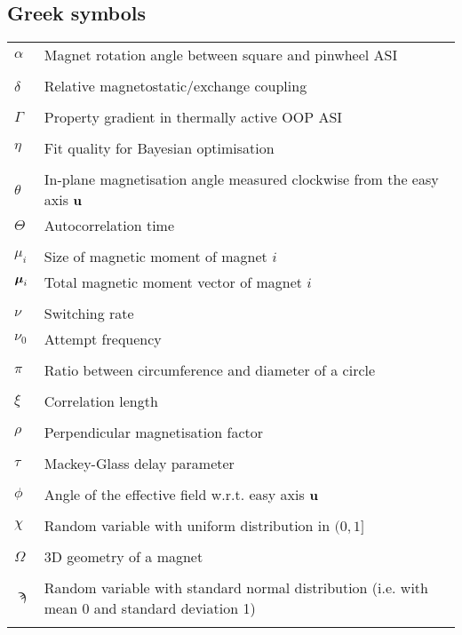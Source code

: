 \subsection*{Greek symbols}
\begin{longtable}[l]{p{60pt} p{350pt}}
	$\alpha$ & Magnet rotation angle between square and pinwheel ASI \\
	&\\

	$\delta$ & Relative magnetostatic/exchange coupling \\
	&\\

	$\Gamma$ & Property gradient in thermally active OOP ASI \\
	&\\
	
	$\eta$ & Fit quality for Bayesian optimisation \\
	&\\

	$\theta$ & In-plane magnetisation angle measured clockwise from the easy axis $\boldsymbol{\mathbf{u}}$ \\
	$\Theta$ & Autocorrelation time \\
	&\\

	$\mu_i$ & Size of magnetic moment of magnet $i$ \\
	$\boldsymbol{\mathbf{\mu}}_i$ & Total magnetic moment vector of magnet $i$ \\
	&\\
	
	$\nu$ & Switching rate \\
	$\nu_0$ & Attempt frequency \\
	&\\
	
	$\pi$ & Ratio between circumference and diameter of a circle \\
	&\\
	
	$\xi$ & Correlation length \\
	&\\

	$\rho$ & Perpendicular magnetisation factor \\
	&\\

	$\tau$ & Mackey-Glass delay parameter \\
	&\\

	$\phi$ & Angle of the effective field w.r.t. easy axis $\boldsymbol{\mathbf{u}}$ \\
	&\\

	$\chi$ & Random variable with uniform distribution in $(0, 1]$ \\
	&\\
	
	$\Omega$ & 3D geometry of a magnet \\
	&\\
	
	$\sampi$ & Random variable with standard normal distribution (i.e. with mean 0 and standard deviation 1) \\
	&\\
\end{longtable}
